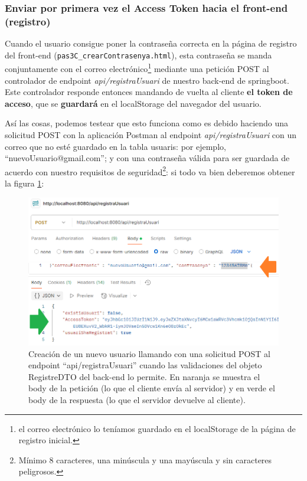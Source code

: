 \documentclass[a4paper,12pt]{report}
\begin{document}
		\subsubsection{Enviar por primera vez el Access Token hacia el front-end (registro)}
		\label{sec:enviarPorPrimeraVezAccesTokenDESDEBACKEND}
		
		Cuando el usuario consigue poner la contraseña correcta en la página de registro del front-end (\texttt{pas3C\_crearContrasenya.html}), esta contraseña se manda conjuntamente con el correo electrónico\footnote{el correo electrónico  lo teníamos guardado en el localStorage de la página de registro inicial.}  mediante una petición POST al controlador de endpoint \textit{api/registraUsuari} de nuestro back-end de springboot. Este controlador responde entonces mandando de vuelta al cliente \textbf{el token de acceso}, que se \textbf{guardará} en el localStorage del navegador del usuario.
		
		
		Así las cosas, podemos testear que esto funciona como es debido haciendo una solicitud POST con la aplicación Postman\cite{postman_api_platform} al endpoint \textit{api/registraUsuari} con un correo que no esté guardado en la tabla usuaris: por ejemplo, ``nuevoUsuario@gmail.com''; y con una contraseña válida para ser guardada de acuerdo con nuestro requisitos de seguridad\footnote{Mínimo 8 caracteres, una minúscula y una mayúscula y sin caracteres peligrosos.}: si todo va bien deberemos obtener la figura \ref{fig:detallPostmanRegistraUsuari}:
		
		
		
		\setlength{\abovecaptionskip}{0pt}
		\FloatBarrier
		\begin{figure}[H]
			\centering
			\includegraphics[width=1\textwidth]{img/detallPostmanRegistraUsuari.png}
			\caption{Creación de un nuevo usuario llamando con una solicitud POST al endpoint ``api/registraUsuari'' cuando las validaciones del objeto RegistreDTO del back-end lo permite. En naranja se muestra el body de la petición (lo que el cliente envía al servidor) y en verde el body de la respuesta (lo que el servidor devuelve al cliente).}
			
			\label{fig:detallPostmanRegistraUsuari} 
		\end{figure}
		\FloatBarrier
		
\end{document}

